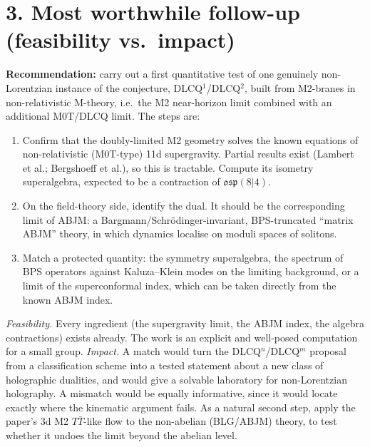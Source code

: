 \documentclass[11pt]{article}
\begin{document}
\section*{3. Most worthwhile follow-up (feasibility vs.\ impact)}
\textbf{Recommendation:} carry out a first quantitative test of one genuinely non-Lorentzian instance of the conjecture, DLCQ$^1$/DLCQ$^2$, built from M2-branes in non-relativistic M-theory, i.e.\ the M2 near-horizon limit combined with an additional M0T/DLCQ limit. The steps are:
\begin{enumerate}
\item Confirm that the doubly-limited M2 geometry solves the known equations of non-relativistic (M0T-type) 11d supergravity. Partial results exist (Lambert et al.; Bergshoeff et al.), so this is tractable. Compute its isometry superalgebra, expected to be a contraction of $\mathfrak{osp}(8|4)$.
\item On the field-theory side, identify the dual. It should be the corresponding limit of ABJM: a Bargmann/Schr\"odinger-invariant, BPS-truncated ``matrix ABJM'' theory, in which dynamics localise on moduli spaces of solitons.
\item Match a protected quantity: the symmetry superalgebra, the spectrum of BPS operators against Kaluza--Klein modes on the limiting background, or a limit of the superconformal index, which can be taken directly from the known ABJM index.
\end{enumerate}
\emph{Feasibility.} Every ingredient (the supergravity limit, the ABJM index, the algebra contractions) exists already. The work is an explicit and well-posed computation for a small group.
\emph{Impact.} A match would turn the DLCQ$^n$/DLCQ$^m$ proposal from a classification scheme into a tested statement about a new class of holographic dualities, and would give a solvable laboratory for non-Lorentzian holography. A mismatch would be equally informative, since it would locate exactly where the kinematic argument fails. As a natural second step, apply the paper's 3d M2 $T\bar T$-like flow to the non-abelian (BLG/ABJM) theory, to test whether it undoes the limit beyond the abelian level.
\end{document}
